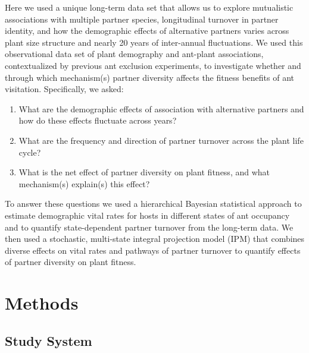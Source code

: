 \documentclass[11pt]{article}
\begin{document}
Here we used a unique long-term data set that allows us to explore mutualistic associations with multiple partner species, longitudinal turnover in partner identity, and how the demographic effects of alternative partners varies across plant size structure and nearly 20 years of inter-annual fluctuations. 
We used this observational data set of plant demography and ant-plant associations, contextualized by previous ant exclusion experiments, to investigate whether and through which mechanism(s) partner diversity affects the fitness benefits of ant visitation. 
Specifically, we asked:
	\begin{enumerate}	
		\item{What are the demographic effects of association with alternative partners and how do these effects fluctuate across years?}
		\item{What are the frequency and direction of partner turnover across the plant life cycle?}	
		\item{What is the net effect of partner diversity on plant fitness, and what mechanism(s) explain(s) this effect?}
	\end{enumerate}
To answer these questions we used a hierarchical Bayesian statistical approach to estimate demographic vital rates for hosts in different states of ant occupancy and to quantify state-dependent partner turnover from the long-term data. 
We then used a stochastic, multi-state integral projection model (IPM) that combines diverse effects on vital rates and pathways of partner turnover to quantify effects of partner diversity on plant fitness. 


\section*{Methods}
\subsection*{Study System}
  
\end{document}

